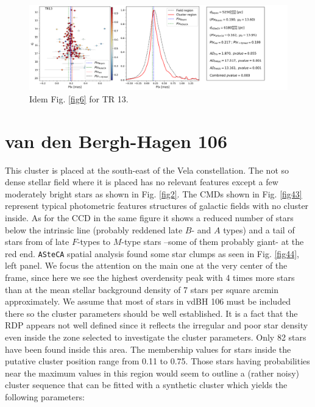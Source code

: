 \documentclass[draft]{aa}
\begin{document}
\begin{figure}[ht]
    \centering
    \includegraphics[width=\hsize]{../figs/plx_TR13.png}
    \caption{Idem Fig. \ref{fig6} for TR 13.}
    \label{fig42}
\end{figure}



\section{van den Bergh-Hagen 106}

This cluster is placed at the south-east of the Vela constellation. The not so
dense stellar field where it is placed has no relevant features except a few
moderately bright stars as shown in Fig. \ref{fig2}. The CMDs shown in
Fig. \ref{fig43} represent typical photometric features structures of galactic
fields with no cluster inside. As for the CCD in the same figure it shows a
reduced number of stars below the intrinsic line (probably reddened late $B$-
and $A$ types) and a tail of stars from of late $F$-types to $M$-type stars
–some of them probably giant- at the red end.
%
\texttt{ASteCA} spatial analysis found some star clumps as seen in Fig. 
\ref{fig44}, left panel. We focus the attention on the main one at the very
center of the frame, since here we see the highest overdensity peak with 4 times
more stars than at the mean stellar background density of 7 stars per square
arcmin approximately. We assume that most of stars in vdBH 106
must be included there so the cluster parameters should be well established. It
is a fact that the RDP appears not well defined since it reflects the irregular
and poor star density even inside the zone selected to investigate the cluster
parameters. Only 82 stars have been found inside this area. The
membership values for stars inside the putative cluster position range from
0.11 to 0.75. Those stars having probabilities near the maximum values
in this region would seem to outline a (rather noisy) cluster sequence that can
be fitted with a synthetic cluster which yields the following parameters:
\end{document}
